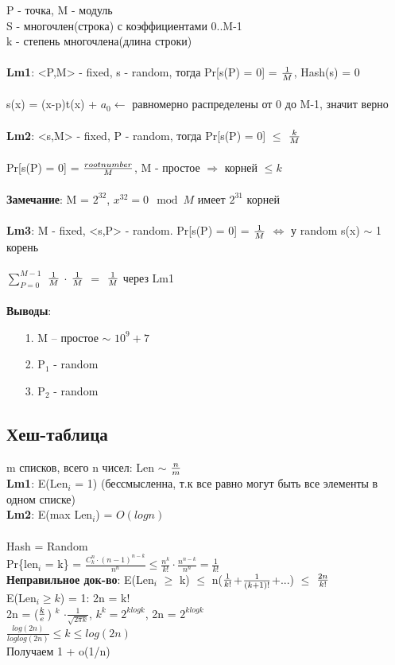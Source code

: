 P - точка, M - модуль\\
S - многочлен(строка) с коэффициентами 0..M-1\\
k - степень многочлена(длина строки) \\\\
\textbf{Lm1}: <P,M> - fixed, s - random, тогда Pr[s(P) = 0] = ${1}\over{M}$, Hash(s) = 0\\\\
s(x) = (x-p)t(x) + $a_0 \leftarrow$ равномерно распределены от 0 до M-1, значит верно\\\\ 
\textbf{Lm2}: <s,M> - fixed, P - random, тогда Pr[s(P) = 0] $\le$ ${k}\over{M}$ \\\\
Pr[s(P) = 0] = ${ root number \over{M}}$, M - простое $\Rightarrow$ корней $\le k$\\\\
\textbf{Замечание}: M = $2^{32}$, $x^{32} = 0 \mod M$ имеет $2^{31}$ корней \\\\
\textbf{Lm3}: M - fixed, <s,P> - random. Pr[s(P) = 0] = ${1}\over{M}$ $\Leftrightarrow$ у random s(x) $\sim$ 1 корень \\\\
$\sum_{P=0}^{M-1}$ $1\over{M}$ $\cdot$ $1\over{M}$ $=$ $1\over{M}$ через Lm1\\\\
\textbf{Выводы}:
\begin{enumerate}
	\item[1.] M -- простое  $\sim$ $10^9+7$
	\item[2.] P$_1$ - random
	\item[3.] P$_2$ - random
\end{enumerate}   

\subsection{Хеш-таблица}
m списков, всего n чисел: Len $\sim$ $n\over{m}$\\
\textbf{Lm1}: E(Len$_i$ = 1) (бессмысленна, т.к все равно могут быть все элементы в одном списке) \\
\textbf{Lm2}: E(max Len$_i$) = $O(log n)$\\\\
Hash = Random\\
Pr\{len$_i$ = k\} = $\frac{C^n_k \cdot (n-1)^{n-k}}{n^n} \le \frac{n^k}{k!}\cdot\frac{n^{n-k}}{n^n} = \frac{1}{k!}$ \\
\textbf{Неправильное док-во}: E(Len$_i$ $\ge$ k) $\le$ n($1\over{k!}$+$1\over{(k+1)!}$+...) $\le$ $2n\over{k!}$ \\
E(Len$_i \ge k$) = 1: 2n = k!\\
2n = ($k\over{e}$) $^k$ $\cdot \frac{1}{\sqrt{2 \pi k}}$, $k^k = 2^{klogk}$, 2n = $2^{klogk}$ \\
$\frac{log(2n)}{loglog(2n)} \le k \le log(2n)$ \\
Получаем 1 + o(1/n)\\\\

